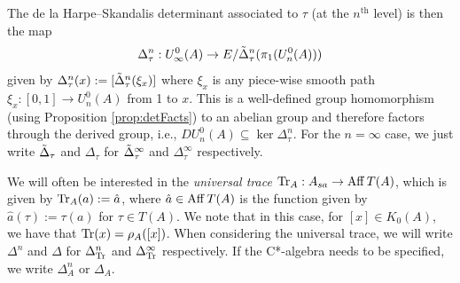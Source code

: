 \documentclass[12pt]{amsart}
\begin{document}
  The de la Harpe--Skandalis determinant associated to $\tau$ (at the $n^{\text{th}}$ level) is then the map
  \begin{equation} \Delta_\tau^n: U_{\infty}^0(A) \to E/\tilde{\Delta}_\tau^n(\pi_1(U_n^0(A))) \end{equation}
  given by $\Delta_\tau^n(x) := [\tilde{\Delta}_\tau^n(\xi_x)]$ where $\xi_x$ is any piece-wise smooth path $\xi_x: [0,1] \to U_n^0(A)$ from 1 to $x$. This is a well-defined group homomorphism (using Proposition \ref{prop:detFacts}) to an abelian group and therefore factors through the derived group, i.e., $DU_n^0(A) \subseteq \ker \Delta_\tau^n$. For the $n = \infty$ case, we just write $\tilde{\Delta}_\tau$ and $\Delta_\tau$ for $\tilde{\Delta}_\tau^{\infty}$ and $\Delta_\tau^{\infty}$ respectively.
  
  We will often be interested in the \emph{universal trace} $\text{Tr}_A: A_{sa} \to \operatorname{Aff} T(A)$, which is  given by $\text{Tr}_A(a) := \hat{a}$, where $\hat{a} \in \operatorname{Aff} T(A)$ is the function given by $\hat{a}(\tau) := \tau(a)$ for $\tau \in T(A)$. We note that in this case, for $[x] \in K_0(A)$, we have that $\text{Tr}(x) = \rho_A([x])$.  When considering the universal trace, we will write $\Delta^n$ and $\Delta$ for $\Delta_{\text{Tr}}^n$ and $\Delta_{\text{Tr}}^{\infty}$ respectively. If the C*-algebra needs to be specified, we write $\Delta_A^n$ or $\Delta_A$.
  
\end{document}

